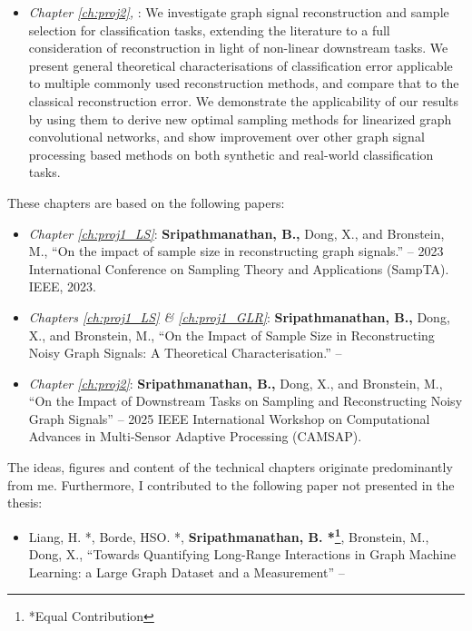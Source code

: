\begin{itemize}
    Finally, we prove that all of these results are robust to changes in the signal model, and prove our results for both full-band and bandlimited noise. 
    \item \emph{Chapter \ref{ch:proj2}, }: We investigate graph signal reconstruction and sample selection for classification tasks, extending the literature to a full consideration of reconstruction in light of non-linear downstream tasks. We present general theoretical characterisations of classification error applicable to multiple commonly used reconstruction methods, and compare that to the classical reconstruction error. We demonstrate the applicability of our results by using them to derive new optimal sampling methods for linearized graph convolutional networks, and show improvement over other graph signal processing based methods on both synthetic and real-world classification tasks.
\end{itemize}

These chapters are based on the following papers:

\begin{itemize}
    \item \emph{Chapter \ref{ch:proj1_LS}}: \textbf{Sripathmanathan, B.,} Dong, X., and  Bronstein, M., ``On the impact of sample size in reconstructing graph signals.'' -- 2023 International Conference on Sampling Theory and Applications (SampTA). IEEE, 2023.
    \item \emph{Chapters \ref{ch:proj1_LS} \& \ref{ch:proj1_GLR}}: \textbf{Sripathmanathan, B.,} Dong, X., and Bronstein, M., ``On the Impact of Sample Size in Reconstructing Noisy Graph Signals: A Theoretical Characterisation.'' -- 
    \item \emph{Chapter \ref{ch:proj2}}: \textbf{Sripathmanathan, B.,} Dong, X., and Bronstein, M., ``On the Impact of Downstream Tasks on Sampling and Reconstructing Noisy Graph Signals'' -- 2025 IEEE International Workshop on Computational Advances in Multi-Sensor Adaptive Processing (CAMSAP).
\end{itemize}

The ideas, figures and content of the technical chapters originate predominantly from me. Furthermore, I contributed to the following paper not presented in the thesis:

\begin{itemize}
    \item Liang, H. *, Borde, HSO. *, \textbf{Sripathmanathan, B. *\footnote{ *Equal Contribution}}, Bronstein, M., Dong, X., ``Towards Quantifying Long-Range Interactions in Graph Machine Learning: a Large Graph Dataset and a Measurement'' -- 
\end{itemize}


